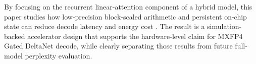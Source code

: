 By focusing on the recurrent linear-attention component of a hybrid model, this
paper studies how low-precision block-scaled arithmetic and persistent on-chip
state can reduce decode latency and energy cost \cite{b5}. The result is a
simulation-backed accelerator design that supports the hardware-level claim for
MXFP4 Gated DeltaNet decode, while clearly separating those results from future
full-model perplexity evaluation.

